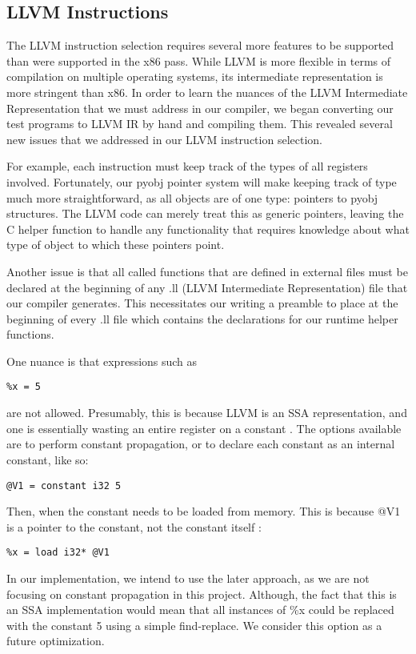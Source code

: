 \documentclass[11pt,twocolumn]{article}
\begin{document}
\subsection{LLVM Instructions}

The LLVM instruction selection requires several more features to be
supported than were supported in the x86 pass. While LLVM is more
flexible in terms of compilation on multiple operating systems, its
intermediate representation is more stringent than x86. In order to
learn the nuances of the LLVM Intermediate Representation that we must
address in our compiler, we began converting our test programs
to LLVM IR by hand and compiling them. This revealed several new issues
that we addressed in our LLVM instruction selection.

For example, each instruction must keep track of the types of all
registers involved. Fortunately, our pyobj pointer system will make
keeping track of type much more straightforward, as all objects are of
one type: pointers to pyobj structures. The LLVM code can merely treat
this as generic pointers, leaving the C helper function to handle any
functionality that requires knowledge about what type of object to
which these pointers point.

Another issue is that all called functions that are defined in
external files must be declared at the beginning of any .ll (LLVM
Intermediate Representation) file that our compiler generates. This
necessitates our writing a preamble to place at the beginning of every
.ll file which contains the declarations for our runtime helper
functions.

One nuance is that expressions such as
\begin{verbatim}
%x = 5
\end{verbatim} 
are not allowed. Presumably, this is because LLVM is an SSA
representation, and one is essentially wasting an entire register on a
constant \cite{llvm-discussions}. The options available are to perform
constant propagation, or to declare each constant as an internal
constant, like so:
\begin{verbatim}
@V1 = constant i32 5
\end{verbatim}
Then, when the constant needs to be loaded from memory. This is
because @V1 is a pointer to the constant, not the constant itself
\cite{Regni}:
\begin{verbatim}
%x = load i32* @V1
\end{verbatim}

In our implementation, we intend to use the later approach, as we are
not focusing on constant propagation in this project. Although, the
fact that this is an SSA implementation would mean that all instances
of \%x could be replaced with the constant 5 using a simple
find-replace. We consider this option as a future optimization.
\end{document}
